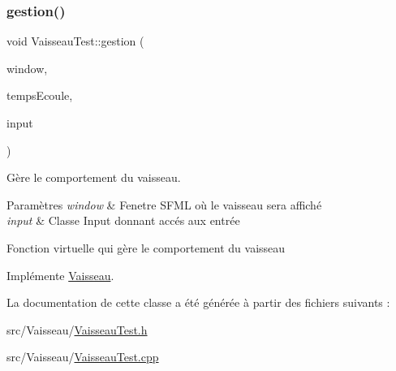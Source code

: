 \subsubsection{\texorpdfstring{gestion()}{gestion()}}
{\footnotesize\ttfamily void Vaisseau\+Test\+::gestion (\begin{DoxyParamCaption}\item[{sf\+::\+Render\+Window \&}]{window,  }\item[{sf\+::\+Time}]{temps\+Ecoule,  }\item[{\hyperlink{_input_8h_a5588d60d674991c719a8df848313e966}{Input} \&}]{input }\end{DoxyParamCaption})\hspace{0.3cm}{\ttfamily [virtual]}}



Gère le comportement du vaisseau. 


\begin{DoxyParams}{Paramètres}
{\em window} & Fenetre S\+F\+ML où le vaisseau sera affiché \\
\hline
{\em input} & Classe Input donnant accés aux entrée\\
\hline
\end{DoxyParams}
Fonction virtuelle qui gère le comportement du vaisseau 

Implémente \hyperlink{class_vaisseau_afaa179c1f03255d7869b8e2296ed8307}{Vaisseau}.



La documentation de cette classe a été générée à partir des fichiers suivants \+:\begin{DoxyCompactItemize}
\item 
src/\+Vaisseau/\hyperlink{_vaisseau_test_8h}{Vaisseau\+Test.\+h}\item 
src/\+Vaisseau/\hyperlink{_vaisseau_test_8cpp}{Vaisseau\+Test.\+cpp}\end{DoxyCompactItemize}
